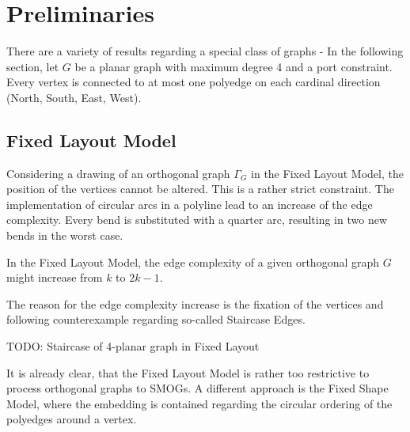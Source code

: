 \label{key}\section{Preliminaries}
There are a variety of results regarding a special class of graphs - In the following section, let $G$ be a planar graph with maximum degree 4 and a port constraint. Every vertex is connected to at most one polyedge on each cardinal direction (North, South, East, West). 
\subsection{Fixed Layout Model}
Considering a drawing of an orthogonal graph $\Gamma_G$ in the Fixed Layout Model, the position of the vertices cannot be altered. This is a rather strict constraint. The implementation of circular arcs in a polyline lead to an increase of the edge complexity. Every bend is substituted with a quarter arc, resulting in two new bends in the worst case.
\begin{theorem}
	In the Fixed Layout Model, the edge complexity of a given orthogonal graph $G$ might increase from $k$ to $2k-1$.
\end{theorem}
The reason for the edge complexity increase is the fixation of the vertices and following counterexample regarding so-called \grqq Staircase Edges\grqq.
\begin{center}
	TODO: Staircase of 4-planar graph in Fixed Layout
\end{center}
It is already clear, that the Fixed Layout Model is rather too restrictive to process orthogonal graphs to SMOGs. A different approach is the Fixed Shape Model, where the embedding is contained regarding the circular ordering of the polyedges around a vertex.
